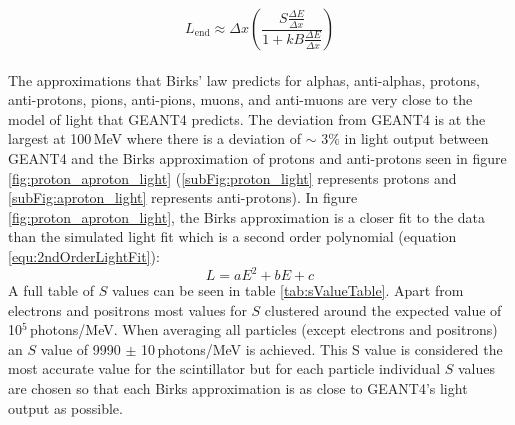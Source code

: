 \begin{equation}
L_{\textrm{end}}\approx \Delta x \left(\frac{S\frac{\Delta E}{\Delta x}}{1 + kB \frac{\Delta E}{\Delta x}}\right) 
\label{equ:light_produced}
\end{equation}
\\The approximations that Birks' law predicts for alphas, anti-alphas, protons, anti-protons, pions, anti-pions, muons, and anti-muons are very close to the model of light that GEANT4 predicts. The deviation from GEANT4 is at the largest at 100\,MeV where there is a deviation of $\sim$ $3\%$ in light output between GEANT4 and the Birks approximation of protons and anti-protons seen in figure \ref{fig:proton_aproton_light} (\ref{subFig:proton_light} represents protons and \ref{subFig:aproton_light} represents anti-protons). In figure \ref{fig:proton_aproton_light}, the Birks approximation is a closer fit to the data than the simulated light fit which is a second order polynomial (equation \ref{equ:2ndOrderLightFit}):
\begin{equation}
    L = aE^2 + bE+ c 
    \label{equ:2ndOrderLightFit}
\end{equation}
A full table of $S$ values can be seen in table \ref{tab:sValueTable}. Apart from electrons and positrons most values for $S$ clustered around the expected value of 10$^5$\,photons/MeV. When averaging all particles (except electrons and positrons) an $S$ value of 9990 $\pm$ 10\,photons/MeV is achieved. This S value is considered the most accurate value for the scintillator but for each particle individual $S$ values are chosen so that each Birks approximation is as close to GEANT4's light output as possible.

